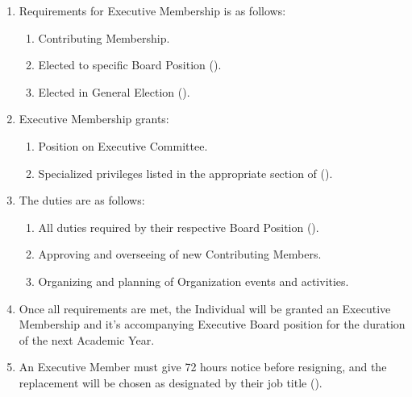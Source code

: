 \begin{enumerate}
	\item Requirements for Executive Membership is as follows:
		\begin{enumerate}
			\item Contributing Membership.

			\item Elected to specific Board Position ().

			\item Elected in General Election ().
		\end{enumerate}

	\item Executive Membership grants:
		\begin{enumerate}
			\item Position on Executive Committee.

			\item Specialized privileges listed in the appropriate section of ().
		\end{enumerate}

	\item The duties are as follows:
		\begin{enumerate}
			\item All duties required by their respective Board Position ().

			\item Approving and overseeing of new Contributing Members.

			\item Organizing and planning of Organization events and activities.
		\end{enumerate}

	\item Once all requirements are met, the Individual will be granted an
		Executive Membership and it's accompanying Executive Board position for the
		duration of the next Academic Year.

	\item An Executive Member must give 72 hours notice before resigning, and the
		replacement will be chosen as designated by their job title ().
\end{enumerate}

